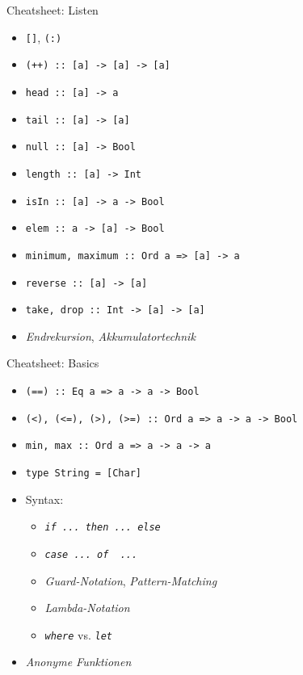 \documentclass{beamer}
\begin{document}
\begin{frame}{Cheatsheet: Listen}
	\begin{itemize}
          \item \texttt{[]}, \texttt{(:)}
          \item \texttt{(++) :: [a] -> [a] -> [a]}
          \item \texttt{head :: [a] -> a}
          \item \texttt{tail :: [a] -> [a]}
          \item \texttt{null :: [a] -> Bool}
          \item \texttt{length :: [a] -> Int}
          \item \texttt{isIn :: [a] -> a -> Bool}
          \item \texttt{elem :: a -> [a] -> Bool}
          \item \texttt{minimum, maximum :: Ord a => [a] -> a}
          \item \texttt{reverse :: [a] -> [a]}
          \item \texttt{take, drop :: Int -> [a] -> [a]}
          \item \emph{Endrekursion}, \emph{Akkumulatortechnik}
	\end{itemize}
\end{frame}

\begin{frame}{Cheatsheet: Basics}
	\begin{itemize}
          \item \texttt{(==) :: Eq a => a -> a -> Bool}
          \item \texttt{(<), (<=), (>), (>=) :: Ord a => a -> a -> Bool}
          \item \texttt{min, max :: Ord a => a -> a -> a}
          \item \texttt{type String = [Char]}
          \item Syntax:
          \begin{itemize}
            \item \emph{\texttt{if ... then ... else}}
            \item \emph{\texttt{case ... of { ... }}}
            \item \emph{Guard-Notation}, \emph{Pattern-Matching}
            \item \emph{Lambda-Notation}
            \item \emph{\texttt{where}} vs. \emph{\texttt{let}}
          \end{itemize}
          \item \emph{Anonyme Funktionen}
	\end{itemize}
\end{frame}
\end{document}
